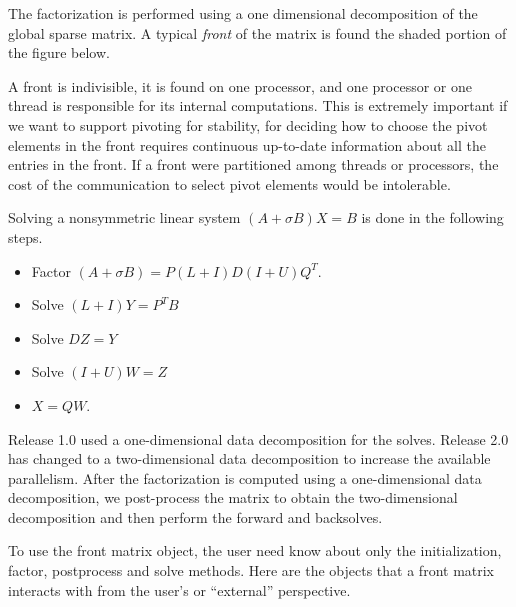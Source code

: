 \par
The factorization is performed using a one dimensional
decomposition of the global sparse matrix.
A typical {\it front} of the matrix is found the shaded portion of
the figure below.
\begin{center}
\end{center}
A front is indivisible, it is found on one processor, and one processor
or one thread is responsible for its internal computations.
This is extremely important if we want to support pivoting for
stability, for deciding how to choose the pivot elements in the
front requires continuous up-to-date information about all the
entries in the front.
If a front were partitioned among threads or processors, the
cost of the communication to select pivot elements would be intolerable.
\par
Solving a nonsymmetric linear system
$(A + \sigma B)X = B$ is done in the following steps.
\begin{itemize}
\item Factor $(A + \sigma B) = P(L + I)D(I + U)Q^T$.
\item Solve $(L + I) Y = P^T B$
\item Solve $D Z = Y$
\item Solve $(I + U) W = Z$
\item $X = Q W$.
\end{itemize}
Release 1.0 used a one-dimensional data decomposition for the solves.
Release 2.0 has changed to a two-dimensional data decomposition to
increase the available parallelism.
After the factorization is computed using a one-dimensional data
decomposition, we post-process the matrix to obtain the
two-dimensional decomposition and then perform the forward and
backsolves.
\par
To use the front matrix object, the user need know about only the
initialization, factor, postprocess and solve methods.
Here are the objects that a front matrix interacts with from the
user's or ``external'' perspective.
